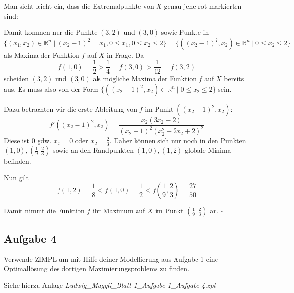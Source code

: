 \documentclass{article}
\begin{document}
Man sieht leicht ein, dass die Extremalpunkte von $X$ genau jene rot markierten sind:
\begin{center}
\end{center}
Damit kommen nur die Punkte $(3,2)$ und $(3,0)$ sowie Punkte in
$$\{(x_1,x_2) \in \mathbb{R}^n \mid (x_2-1)^2 = x_1, 0 \leq x_1, 0 \leq x_2 \leq 2\} = \{((x_2-1)^2,x_2) \in \mathbb{R}^n \mid 0 \leq x_2 \leq 2 \}$$
als Maxima der Funktion $f$ auf $X$ in Frage. Da
$$f(1,0) = \frac{1}{2} > \frac{1}{4} = f(3,0) > \frac{1}{12}=f(3,2)$$ scheiden $(3,2)$ und $(3,0)$ als mögliche Maxima der Funktion $f$ auf $X$ bereits aus. Es muss also von der Form $\{((x_2-1)^2,x_2) \in \mathbb{R}^n \mid 0 \leq x_2 \leq 2 \}$ sein.\par \smallskip
Dazu betrachten wir die erste Ableitung von $f$ im Punkt $((x_2-1)^2,x_2)$:
$$f'((x_2-1)^2,x_2) = \frac{x_2(3x_2-2)}{(x_2+1)^2(x_2^2-2x_2+2)^2}$$
Diese ist $0$ gdw. $x_2= 0$ oder $x_2 = \frac{2}{3}$. Daher können sich nur noch in den Punkten $(1,0), \left (\frac{1}{9},\frac{2}{3} \right)$ sowie an den Randpunkten $(1,0),(1,2)$ globale Minima befinden. \par \smallskip
Nun gilt
$$f(1,2) = \frac{1}{8} < f(1,0) = \frac{1}{2} < f \left (\frac{1}{9},\frac{2}{3} \right)=\frac{27}{50}$$

Damit nimmt die Funktion $f$ ihr Maximum auf $X$ im Punkt $\left (\frac{1}{9},\frac{2}{3} \right)$ an. \hfill $\square$

\subsection*{Aufgabe 4} Verwende ZIMPL um mit Hilfe deiner Modellierung aus Aufgabe 1 eine Optimallösung des dortigen Maximierungsproblems zu finden. \par \smallskip

Siehe hierzu Anlage \textit{Ludwig\_Muggli\_Blatt-1\_Aufgabe-1\_Aufgabe-4.zpl}.
\end{document}
